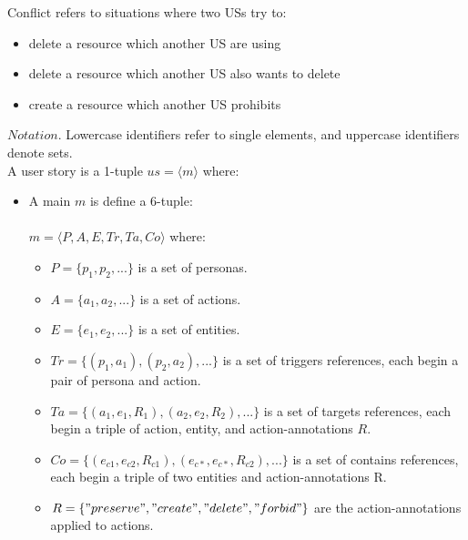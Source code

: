\begin{definition}
	Conflict refers to situations where two USs try to:	 
	\begin{itemize}
		\item delete a resource which another US are using
		\item delete a resource which another US also wants to delete
		\item create a resource which another US prohibits
	\end{itemize}
	$Notation$. Lowercase identifiers refer to single elements, and uppercase identifiers denote sets. 
	\\A user story is a 1-tuple $us = \langle m\rangle $ where:
	\begin{itemize}
		\item A main $m$ is define a 6-tuple: \\\\$m = \langle P,A,E,Tr,Ta,Co\rangle $ where:
	\begin{itemize}
		\item $P = \{ p_1,p_2,...\} $ is a set of personas.
		
		\item $A = \{ a_1,a_2,...\} $ is a set of actions.
		
		\item $E = \{e_1,e_2,...\}$ is a set of entities.
		
		\item $Tr = \{(p_1,a_1),(p_2,a_2),...\}$ is a set of triggers references, each begin a pair of persona and action.
		
		\item $Ta = \{(a_1,e_1,R_1),(a_2,e_2,R_2),...\}$ is a set of targets references, each begin a triple of action, entity, and action-annotations $R$.
		
		\item $Co = \{ (e_{c1},e_{c2},R_{c1}),(e_{c*},e_{c*},R_{c2}),... \}$ is a set of contains references, each begin a triple of two entities and action-annotations R.
		
		\item $R = \{"preserve", "create", "delete", "forbid"\}$ are the action-annotations applied to actions.
	\end{itemize}
	

\end{itemize}
\end{definition}
